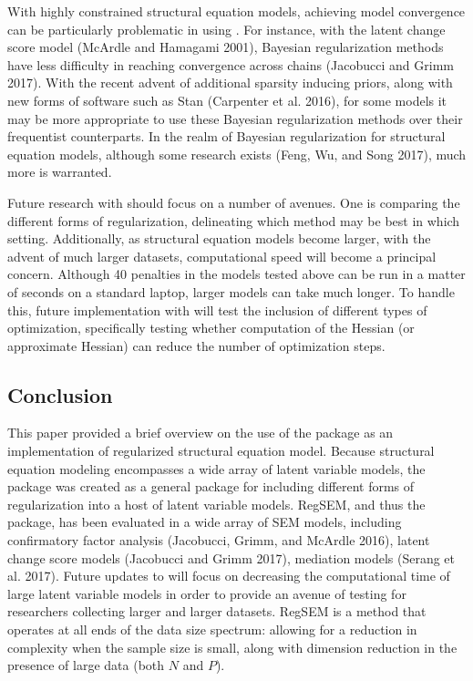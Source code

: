 \documentclass[article]{jss}
\begin{document}
With highly constrained structural equation models, achieving model
convergence can be particularly problematic in using . For
instance, with the latent change score model (McArdle and Hamagami
2001), Bayesian regularization methods have less difficulty in reaching
convergence across chains (Jacobucci and Grimm 2017). With the recent
advent of additional sparsity inducing priors, along with new forms of
software such as Stan (Carpenter et al. 2016), for some models it may be
more appropriate to use these Bayesian regularization methods over their
frequentist counterparts. In the realm of Bayesian regularization for
structural equation models, although some research exists (Feng, Wu, and
Song 2017), much more is warranted.

Future research with  should focus on a number of avenues.
One is comparing the different forms of regularization, delineating
which method may be best in which setting. Additionally, as structural
equation models become larger, with the advent of much larger datasets,
computational speed will become a principal concern. Although 40
penalties in the models tested above can be run in a matter of seconds
on a standard laptop, larger models can take much longer. To handle
this, future implementation with  will test the inclusion of
different types of optimization, specifically testing whether
computation of the Hessian (or approximate Hessian) can reduce the
number of optimization steps.

\subsection{Conclusion}\label{conclusion}

This paper provided a brief overview on the use of the 
package as an implementation of regularized structural equation model.
Because structural equation modeling encompasses a wide array of latent
variable models, the  package was created as a general
package for including different forms of regularization into a host of
latent variable models. RegSEM, and thus the  package, has
been evaluated in a wide array of SEM models, including confirmatory
factor analysis (Jacobucci, Grimm, and McArdle 2016), latent change
score models (Jacobucci and Grimm 2017), mediation models (Serang et al.
2017). Future updates to  will focus on decreasing the
computational time of large latent variable models in order to provide
an avenue of testing for researchers collecting larger and larger
datasets. RegSEM is a method that operates at all ends of the data size
spectrum: allowing for a reduction in complexity when the sample size is
small, along with dimension reduction in the presence of large data
(both \(N\) and \(P\)).
\end{document}
